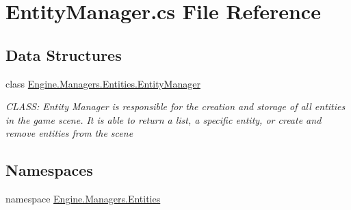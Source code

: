 \hypertarget{a00170}{}\section{Entity\+Manager.\+cs File Reference}
\label{a00170}
\subsection*{Data Structures}
\begin{DoxyCompactItemize}
\item 
class \hyperlink{a00518}{Engine.\+Managers.\+Entities.\+Entity\+Manager}
\begin{DoxyCompactList}\small\item\em C\+L\+A\+SS\+: Entity Manager is responsible for the creation and storage of all entities in the game scene. It is able to return a list, a specific entity, or create and remove entities from the scene \end{DoxyCompactList}\end{DoxyCompactItemize}
\subsection*{Namespaces}
\begin{DoxyCompactItemize}
\item 
namespace \hyperlink{a00269}{Engine.\+Managers.\+Entities}
\end{DoxyCompactItemize}
